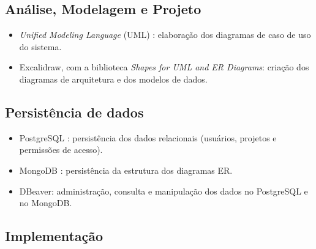 \subsection[Análise, Modelagem e Projeto]{Análise, Modelagem e Projeto}

\begin{itemize}
    \item \textit{Unified Modeling Language} (UML) \cite{UML2015}: elaboração dos diagramas de caso de uso do sistema.
    \item Excalidraw, com a biblioteca \textit{Shapes for UML and ER Diagrams}: criação dos diagramas de arquitetura e dos modelos de dados.
\end{itemize}

\subsection[Persistência de dados]{Persistência de dados}

\begin{itemize}
    \item PostgreSQL \cite{PostgreSQL2024}: persistência dos dados relacionais (usuários, projetos e permissões de acesso).
    \item MongoDB \cite{MongoDB2021}: persistência da estrutura dos diagramas ER.
    \item DBeaver: administração, consulta e manipulação dos dados no PostgreSQL e no MongoDB.
\end{itemize}

\subsection[Implementação]{Implementação}

